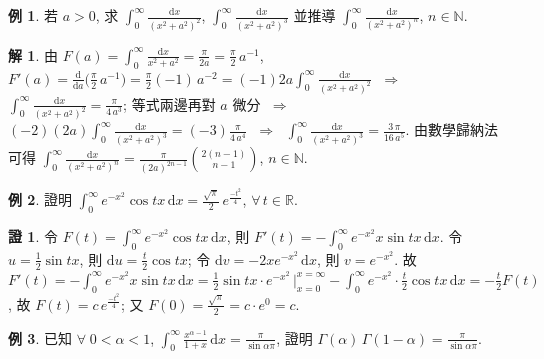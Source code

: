 \documentclass[12pt]{extarticle}
\newcommand{\ds}{\displaystyle}
\newcommand{\ie}{\;\Longrightarrow\;}
\theoremstyle{definition}
\newtheorem*{ex}{例}
\newtheorem*{sol}{解}
\newtheorem*{prf}{證}
\begin{document}
\begin{ex}
  若 $a > 0$, 求 $\ds\int_0^\infty\!\!\frac{\mathrm{d}x}{(x^2 + a^2)^2}$, $\ds\int_0^\infty\!\!\frac{\mathrm{d}x}{(x^2 + a^2)^3}$ 並推導 $\ds\int_0^\infty\!\!\frac{\mathrm{d}x}{(x^2 + a^2)^n}$, $n\in\mathbb{N}$.
\end{ex}

\begin{sol}
  由 $\ds F(a) = \int_0^\infty\!\!\frac{\mathrm{d}x}{x^2 + a^2} = \frac{\pi}{2a} = \frac{\pi}{2}\,a^{-1}$, $\ds F'(a) = \frac{\mathrm{d}}{\mathrm{d}a}\Big(\frac{\pi}{2}\,a^{-1}\Big) = \frac{\pi}{2}(-1)\,a^{-2} = (-1)2a\int_0^\infty\!\!\frac{\mathrm{d}x}{(x^2 + a^2)^2}$ $\ie$ $\ds\int_0^\infty\!\!\frac{\mathrm{d}x}{(x^2 + a^2)^2} = \frac{\pi}{4\,a^3}$; 等式兩邊再對 $a$ 微分 $\ie$ $\ds(-2)(2a)\int_0^\infty\!\!\frac{\mathrm{d}x}{(x^2 + a^2)^3} = (-3)\frac{\pi}{4\,a^4}$ $\ie$ $\ds\int_0^\infty\!\!\frac{\mathrm{d}x}{(x^2 + a^2)^3} = \frac{3\,\pi}{16\,a^5}$. 由數學歸納法可得 $\ds\int_0^\infty\!\!\frac{\mathrm{d}x}{(x^2 + a^2)^n} = \frac{\pi}{(2a)^{2n - 1}}\binom{2(n - 1)}{n - 1}$, $n\in\mathbb{N}$.
\end{sol}

\begin{ex}
  證明 $\ds\int_0^\infty\!\!e^{-x^2}\!\cos tx\,\mathrm{d}x = \frac{\sqrt{\pi}}{2}\,e^{\frac{-t^2}{4}}$, $\forall\,t\in\mathbb{R}$.
\end{ex}

\begin{prf}
  令 $\ds F(t) = \int_0^\infty\!\!e^{-x^2}\!\cos tx\,\mathrm{d}x$, 則 $\ds F'(t) = -\int_0^\infty\!\!e^{-x^2}x\sin tx\,\mathrm{d}x$. 令 $\ds u = \frac{1}{2}\sin tx$, 則 $\ds\mathrm{d}u = \frac{t}{2}\cos tx$; 令 $\ds\mathrm{d}v = -2xe^{-x^2}\,\mathrm{d}x$, 則 $\ds v = e^{-x^2}$. 故 $\ds F'(t) = -\int_0^\infty\!\!e^{-x^2}x\sin tx\,\mathrm{d}x = \frac{1}{2}\sin tx\cdot e^{-x^2}\,\Big|_{x = 0}^{x = \infty} - \int_0^\infty\!\!e^{-x^2}\cdot\frac{t}{2}\cos tx\,\mathrm{d}x = -\frac{t}{2}F(t)$, 故 $\ds F(t) = c\,e^{\frac{-t^2}{4}}$; 又 $\ds F(0) = \frac{\sqrt{\pi}}{2} = c\cdot e^0 = c$.
\end{prf}

\begin{ex}
  已知 $\forall\;0 < \alpha < 1$, $\ds\int_0^\infty\!\frac{x^{\alpha - 1}}{1 + x}\,\text{d}x = \frac{\pi}{\sin\alpha\pi}$, 證明 $\ds\Gamma(\alpha)\,\Gamma(1 - \alpha) = \frac{\pi}{\sin\alpha\pi}$.
\end{ex}
\end{document}
